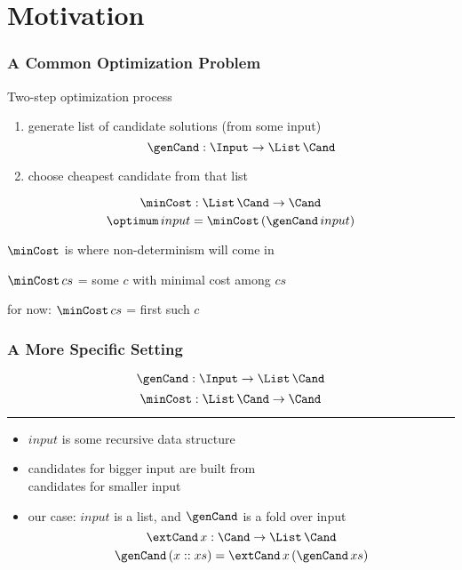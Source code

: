 \documentclass{beamer}
\def\inp{input}
\begin{document}
\section{Motivation}

\begin{frame}\frametitle{A Common Optimization Problem}
Two-step optimization process
\begin{enumerate}
\item generate list of candidate solutions (from some input)
 \[\genCand: \Input\to \List\, \Cand\]
\item choose cheapest candidate from that list
\end{enumerate}
\[\minCost: \List\, \Cand \to \Cand\]
\[\optimum\,\inp = \minCost\,(\genCand\,\inp)\]

\begin{blockitems}{$\minCost$ is where non-determinism will come in}
\item $\minCost\,cs$ = \alert{some} $c$ with minimal cost among $cs$
\item for now: $\minCost\, cs$ = \alert{first} such $c$
\end{blockitems}
\end{frame}


\begin{frame}\frametitle{A More Specific Setting}
\[\genCand: \Input\to \List\, \Cand\]
\[\minCost: \List\, \Cand \to \Cand\]
\hrule
\vspace{.5cm}

\begin{itemize}
\item $\inp$ is some recursive data structure
\item candidates for bigger input are built from \\ candidates for smaller input
\item our case: $\inp$ is a list, and $\genCand$ is a fold over \inp
 \[\extCand\,x: \Cand \to \List\,\Cand\]
 \[\genCand\, (x::xs) = \extCand\, x\,(\genCand\,xs)\]
\end{itemize}
\end{frame}
\end{document}
